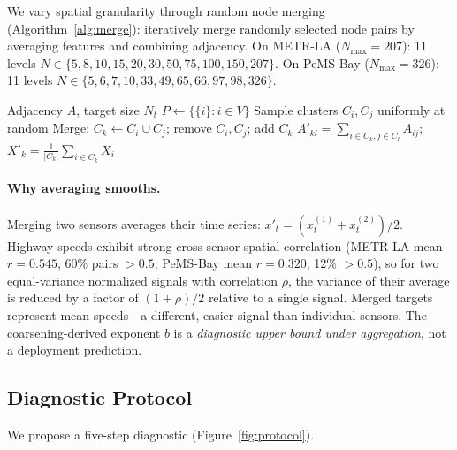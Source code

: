 \documentclass[sigconf]{acmart}
\begin{document}
We vary spatial granularity through random node merging (Algorithm~\ref{alg:merge}): iteratively merge randomly selected node pairs by averaging features and combining adjacency. On METR-LA ($N_\text{max} = 207$): 11 levels $N \in \{5, 8, 10, 15, 20, 30, 50, 75, 100, 150, 207\}$. On PeMS-Bay ($N_\text{max} = 326$): 11 levels $N \in \{5, 6, 7, 10, 33, 49, 65, 66, 97, 98, 326\}$.

\begin{algorithm}[t]
\caption{Random Node Merging (diagnostic intervention)}
\label{alg:merge}
\begin{algorithmic}[1]
\REQUIRE Adjacency $A$, target size $N_t$
\STATE $P \leftarrow \{\{i\} : i \in V\}$
    \STATE Sample clusters $C_i, C_j$ uniformly at random
    \STATE Merge: $C_k \leftarrow C_i \cup C_j$; remove $C_i, C_j$; add $C_k$
\ENDWHILE
\STATE $A'_{kl} = \sum_{i \in C_k, j \in C_l} A_{ij}$; \quad $X'_k = \frac{1}{|C_k|}\sum_{i \in C_k} X_i$
\end{algorithmic}
\end{algorithm}

\paragraph{Why averaging smooths.} Merging two sensors averages their time series: $x'_t = (x^{(1)}_t + x^{(2)}_t)/2$. Highway speeds exhibit strong cross-sensor spatial correlation (METR-LA mean $r{=}0.545$, 60\% pairs ${>}0.5$; PeMS-Bay mean $r{=}0.320$, 12\% ${>}0.5$), so for two equal-variance normalized signals with correlation $\rho$, the variance of their average is reduced by a factor of $(1{+}\rho)/2$ relative to a single signal. Merged targets represent mean speeds---a different, easier signal than individual sensors. The coarsening-derived exponent $b$ is a \textit{diagnostic upper bound under aggregation}, not a deployment prediction.

\subsection{Diagnostic Protocol}

We propose a five-step diagnostic (Figure~\ref{fig:protocol}).
\end{document}
